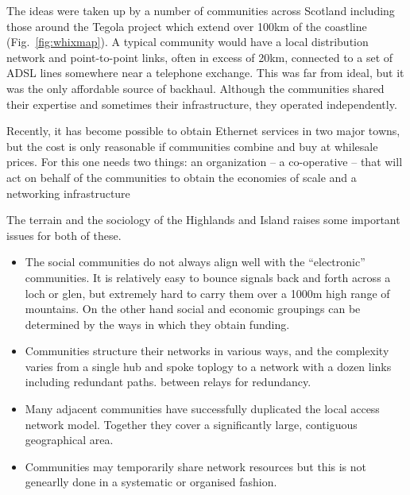 The ideas were taken up by a number of communities across Scotland
including those around the Tegola project which extend over 100km of
the coastline (Fig.~\ref{fig:whixmap}). A typical community would have
a local distribution network and point-to-point links, often in excess
of 20km, connected to a set of ADSL lines somewhere near a telephone
exchange. This was far from ideal, but it was the only affordable
source of backhaul. Although the communities shared their expertise
and sometimes their infrastructure, they operated independently.

Recently, it has become possible to obtain Ethernet services in two
major towns, but the cost is only reasonable if communities combine
and buy at whilesale prices.  For this one needs two things: an
organization -- a co-operative -- that will act on behalf of the
communities to obtain the economies of scale and a networking
infrastructure 

The terrain and the sociology of the Highlands and Island raises some
important issues for both of these.
\begin{itemize}
\item The social communities do not always align well with the
  ``electronic'' communities. It is relatively easy to bounce signals
  back and forth across a loch or glen, but extremely hard to carry
  them over a 1000m high range of mountains. On the other hand
  social and economic groupings can be determined by the ways in which
  they obtain funding.%
\item Communities structure their networks in various ways, and the
  complexity varies from a single hub and spoke toplogy to a network
  with a dozen links including redundant paths.
  between relays for redundancy.
\item Many adjacent communities have successfully duplicated the local
  access network model. Together they cover a significantly large,
  contiguous geographical area.
\item Communities may temporarily share network resources but this is
  not genearlly done in a systematic or organised fashion.
\end{itemize}

